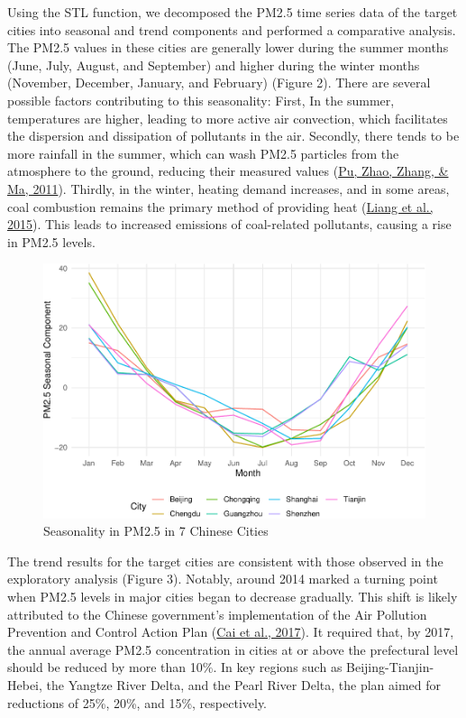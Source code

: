 \documentclass[
  12pt,
]{article}
\begin{document}
Using the STL function, we decomposed the PM2.5 time series data of the
target cities into seasonal and trend components and performed a
comparative analysis. The PM2.5 values in these cities are generally
lower during the summer months (June, July, August, and September) and
higher during the winter months (November, December, January, and
February) (Figure 2). There are several possible factors contributing to
this seasonality: First, In the summer, temperatures are higher, leading
to more active air convection, which facilitates the dispersion and
dissipation of pollutants in the air. Secondly, there tends to be more
rainfall in the summer, which can wash PM2.5 particles from the
atmosphere to the ground, reducing their measured values
(\protect\hyperlink{ref-rain}{Pu, Zhao, Zhang, \& Ma, 2011}). Thirdly,
in the winter, heating demand increases, and in some areas, coal
combustion remains the primary method of providing heat
(\protect\hyperlink{ref-heating}{Liang et al., 2015}). This leads to
increased emissions of coal-related pollutants, causing a rise in PM2.5
levels.

\begin{figure}
\centering
\includegraphics{LiFangRenZhang_ENV872_Project_files/figure-latex/seasonal figure-1.pdf}
\caption{Seasonality in PM2.5 in 7 Chinese Cities}
\end{figure}

The trend results for the target cities are consistent with those
observed in the exploratory analysis (Figure 3). Notably, around 2014
marked a turning point when PM2.5 levels in major cities began to
decrease gradually. This shift is likely attributed to the Chinese
government's implementation of the Air Pollution Prevention and Control
Action Plan (\protect\hyperlink{ref-plan}{Cai et al., 2017}). It
required that, by 2017, the annual average PM2.5 concentration in cities
at or above the prefectural level should be reduced by more than 10\%.
In key regions such as Beijing-Tianjin-Hebei, the Yangtze River Delta,
and the Pearl River Delta, the plan aimed for reductions of 25\%, 20\%,
and 15\%, respectively.
\end{document}
